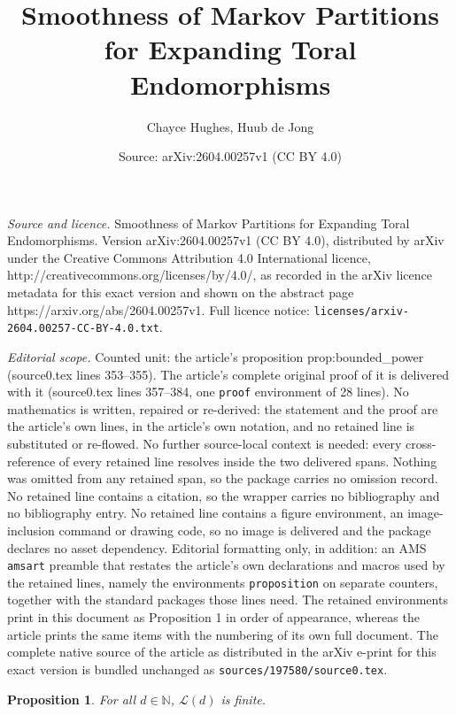 \documentclass[10pt,a4paper]{amsart}
\title{Smoothness of Markov Partitions for Expanding Toral Endomorphisms}
\author{Chayce Hughes, Huub de Jong}
\date{Source: arXiv:2604.00257v1 (CC BY 4.0)}
\newtheorem{proposition}{Proposition}
\def\N{\mathbb{N}}
\begin{document}
\maketitle

\noindent\emph{Source and licence.} Smoothness of Markov Partitions for Expanding Toral Endomorphisms. Version arXiv:2604.00257v1 (CC BY 4.0), distributed by arXiv under the Creative Commons Attribution 4.0 International licence, http://creativecommons.org/licenses/by/4.0/, as recorded in the arXiv licence metadata for this exact version and shown on the abstract page https://arxiv.org/abs/2604.00257v1. Full licence notice: \texttt{licenses/arxiv-2604.00257-CC-BY-4.0.txt}.\par\smallskip

\noindent\textit{Editorial scope.} Counted unit: the article's proposition prop:bounded\_power (source0.tex lines 353--355). The article's complete original proof of it is delivered with it (source0.tex lines 357--384, one \texttt{proof} environment of 28 lines). No mathematics is written, repaired or re-derived: the statement and the proof are the article's own lines, in the article's own notation, and no retained line is substituted or re-flowed.  No further source-local context is needed: every cross-reference of every retained line resolves inside the two delivered spans.  Nothing was omitted from any retained span, so the package carries no omission record.  No retained line contains a citation, so the wrapper carries no bibliography and no bibliography entry.  No retained line contains a figure environment, an image-inclusion command or drawing code, so no image is delivered and the package declares no asset dependency.  Editorial formatting only, in addition: an AMS \texttt{amsart} preamble that restates the article's own declarations and macros used by the retained lines, namely the environments \texttt{proposition} on separate counters, together with the standard packages those lines need.  The retained environments print in this document as Proposition 1 in order of appearance, whereas the article prints the same items with the numbering of its own full document.  The complete native source of the article as distributed in the arXiv e-print for this exact version is bundled unchanged as \texttt{sources/197580/source0.tex}.
\begin{proposition}\label{prop:bounded_power}
    For all $d\in \N$, $\mathcal{L}(d)$ is finite.
\end{proposition}
\end{document}
